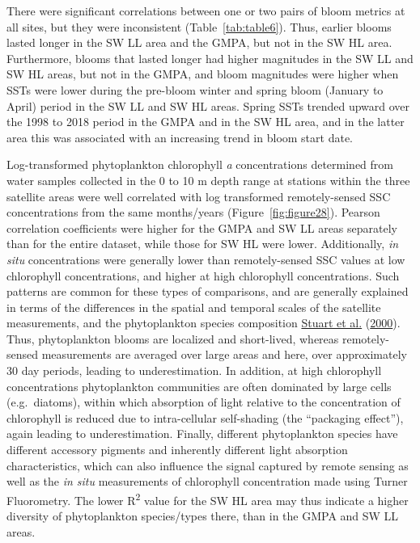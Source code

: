 \documentclass[12pt]{article}\usepackage[]{graphicx}\usepackage[]{color}
\begin{document}
There were significant correlations between one or two pairs of bloom metrics at all sites, but they were inconsistent (Table~\ref{tab:table6}). Thus, earlier blooms lasted longer in the SW LL area and the GMPA, but not in the SW HL area. Furthermore, blooms that lasted longer had higher magnitudes in the SW LL and SW HL areas, but not in the GMPA, and bloom magnitudes were higher when SSTs were lower during the pre-bloom winter and spring bloom (January to April) period in the SW LL and SW HL areas. Spring SSTs trended upward over the 1998 to 2018 period in the GMPA and in the SW HL area, and in the latter area this was associated with an increasing trend in bloom start date.

Log-transformed phytoplankton chlorophyll \emph{a} concentrations determined from water samples collected in the 0 to 10 m depth range at stations within the three satellite areas were well correlated with log transformed remotely-sensed SSC concentrations from the same months/years (Figure~\ref{fig:figure28}). Pearson correlation coefficients were higher for the GMPA and SW LL areas separately than for the entire dataset, while those for SW HL were lower. Additionally, \emph{in situ} concentrations were generally lower than remotely-sensed SSC values at low chlorophyll concentrations, and higher at high chlorophyll concentrations. Such patterns are common for these types of comparisons, and are generally explained in terms of the differences in the spatial and temporal scales of the satellite measurements, and the phytoplankton species composition \protect\hyperlink{ref-stuart_2000}{Stuart et al.} (\protect\hyperlink{ref-stuart_2000}{2000}). Thus, phytoplankton blooms are localized and short-lived, whereas remotely-sensed measurements are averaged over large areas and here, over approximately 30 day periods, leading to underestimation. In addition, at high chlorophyll concentrations phytoplankton communities are often dominated by large cells (e.g.~diatoms), within which absorption of light relative to the concentration of chlorophyll is reduced due to intra-cellular self-shading (the ``packaging effect''), again leading to underestimation. Finally, different phytoplankton species have different accessory pigments and inherently different light absorption characteristics, which can also influence the signal captured by remote sensing as well as the \emph{in situ} measurements of chlorophyll concentration made using Turner Fluorometry. The lower R\textsuperscript{2} value for the SW HL area may thus indicate a higher diversity of phytoplankton species/types there, than in the GMPA and SW LL areas.
\end{document}
